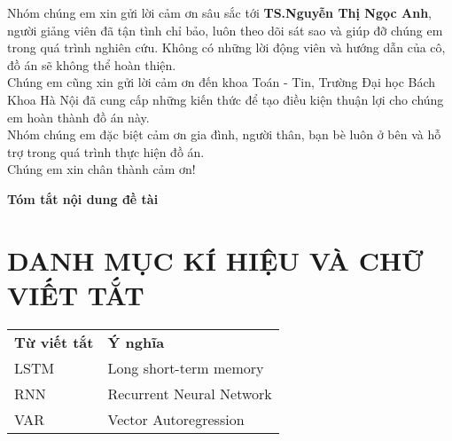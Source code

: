 \documentclass[13pt]{report}
\numberwithin{equation}{section}
\begin{document}
	Nhóm chúng em xin gửi lời cảm ơn sâu sắc tới \textbf{TS.Nguyễn Thị Ngọc Anh}, người giảng viên đã tận tình chỉ bảo, luôn theo dõi sát sao và giúp đỡ chúng em trong quá trình nghiên cứu. Không có những lời động viên và hướng dẫn của cô, đồ án sẽ không thể hoàn thiện.
    \\

    Chúng em cũng xin gửi lời cảm ơn đến khoa Toán - Tin, Trường Đại học Bách Khoa Hà Nội đã cung cấp những kiến thức để tạo điều kiện thuận lợi cho chúng em hoàn thành đồ án này.
    \\
    
    Nhóm chúng em đặc biệt cảm ơn gia đình, người thân, bạn bè luôn ở bên và hỗ trợ trong quá trình thực hiện đồ án.
    \\
    
    Chúng em xin chân thành cảm ơn!
    \thispagestyle{empty}
    \newpage 
	
	\begin{center}
		\bf Tóm tắt nội dung đề tài
	\end{center}
	\thispagestyle{empty}
	\newpage
	\tableofcontents
	\thispagestyle{empty}
	\newpage
	
	{\let\oldnumberline\numberline
\renewcommand{\numberline}{Hình~\oldnumberline}
\listoffigures} 
\thispagestyle{empty}
\newpage
	
	\newpage
	{\let\oldnumberline\numberline
\renewcommand{\numberline}{Bảng~\oldnumberline}
\listoftables}
\thispagestyle{empty}
	\newpage
	\newpage
	\chapter*{DANH MỤC KÍ HIỆU VÀ CHỮ VIẾT TẮT}
	\begin{table}[htp]
		\centering
		\begin{tabular}{ll}
			
			\textbf{Từ viết tắt} & \textbf{Ý nghĩa}\\
			LSTM & Long short-term memory \\
    		RNN & Recurrent Neural Network\\
                VAR & Vector Autoregression
		\end{tabular}
	\end{table}~
\\
\thispagestyle{empty}
	\newpage
	
	
	
	
	
\end{document}
